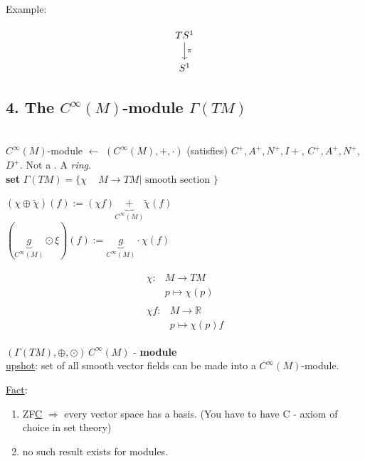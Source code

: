 Example:

\[
\begin{tikzcd}
	TS^1 \arrow{d}{\pi} \\
	S^1 
\end{tikzcd}
\]
	
	\subsection*{4. The $C^{\infty}(M)$-module $\Gamma(TM)$}
	
	\quad \\
	$C^{\infty}(M)$-module $ \leftarrow$ $(C^{\infty}(M), + , \cdot)$
	(satisfies) $C^+, A^+, N^+, I+$, $C^+, A^+, N^+$, $D^+$. Not a . A \emph{ring}. \\
	
	
	\textbf{set} $\Gamma(TM) = \lbrace \chi \quad \, M \to TM | \text{ smooth section } \rbrace$
	
	$(\chi \oplus \widetilde{\chi})(f) := (\chi f)  \underbrace{+}_{C^{\infty}(M)} \widetilde{\chi}(f)$ \\
	
	$(\underbrace{g}_{ C^{\infty}(M)} \odot \xi)(f) := \underbrace{ g }_{C^{\infty}(M)} \cdot \chi(f)$

\[
\begin{gathered}
\begin{aligned}
\chi :& M \to TM \\
& p \mapsto \chi(p)
\end{aligned} \\
\begin{aligned}
\chi f : & M \to \mathbb{R} \\ 
& p \mapsto \chi(p) f
\end{aligned}
\end{gathered}
\]
	
$(\Gamma(TM), \oplus , \odot) \, C^{\infty}(M)$ - \textbf{module} \\

	
	\underline{upshot}: set of all smooth vector fields can be made into a $C^{\infty}(M)$-module.  
	
	\underline{Fact}: \begin{enumerate}
		\item[(1)] ZF\underline{C} $\Longrightarrow $ every vector space has a basis. (You have to have C - axiom of choice in set theory)
		\item[(2)] no such result exists for modules.  
	\end{enumerate}
	
